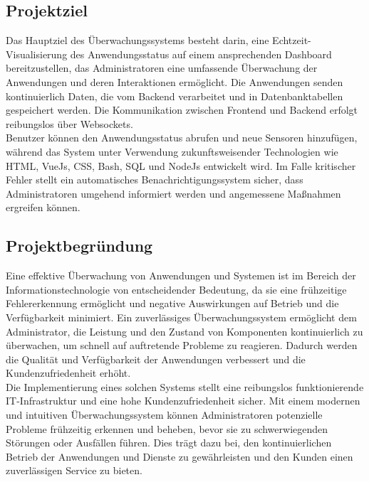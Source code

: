 \begin{flushleft}
	\subsection{Projektziel}
	Das Hauptziel des Überwachungssystems besteht darin, eine Echtzeit-Visualisierung des Anwendungsstatus auf einem ansprechenden Dashboard bereitzustellen, das Administratoren eine umfassende Überwachung der Anwendungen und deren Interaktionen ermöglicht. Die Anwendungen senden kontinuierlich Daten, die vom Backend verarbeitet und in Datenbanktabellen gespeichert werden. Die Kommunikation zwischen Frontend und Backend erfolgt reibungslos über Websockets.
	\\
	Benutzer können den Anwendungsstatus abrufen und neue Sensoren hinzufügen, während das System unter Verwendung zukunftsweisender Technologien wie HTML, VueJs, CSS, Bash, SQL und NodeJs entwickelt wird. Im Falle kritischer Fehler stellt ein automatisches Benachrichtigungssystem sicher, dass Administratoren umgehend informiert werden und angemessene Maßnahmen ergreifen können.
	\subsection{Projektbegründung}
	Eine effektive Überwachung von Anwendungen und Systemen ist im Bereich der Informationstechnologie von entscheidender Bedeutung, da sie eine frühzeitige Fehlererkennung ermöglicht und negative Auswirkungen auf Betrieb und die Verfügbarkeit minimiert. Ein zuverlässiges Überwachungssystem ermöglicht dem Administrator, die Leistung und den Zustand von Komponenten kontinuierlich zu überwachen, um schnell auf auftretende Probleme zu reagieren. Dadurch werden die Qualität und Verfügbarkeit der Anwendungen verbessert und die Kundenzufriedenheit erhöht.
	\\
	Die Implementierung eines solchen Systems stellt eine reibungslos funktionierende IT-Infrastruktur und eine hohe Kundenzufriedenheit sicher. Mit einem modernen und intuitiven Überwachungssystem können Administratoren potenzielle Probleme frühzeitig erkennen und beheben, bevor sie zu schwerwiegenden Störungen oder Ausfällen führen. Dies trägt dazu bei, den kontinuierlichen Betrieb der Anwendungen und Dienste zu gewährleisten und den Kunden einen zuverlässigen Service zu bieten.


\end{flushleft}
